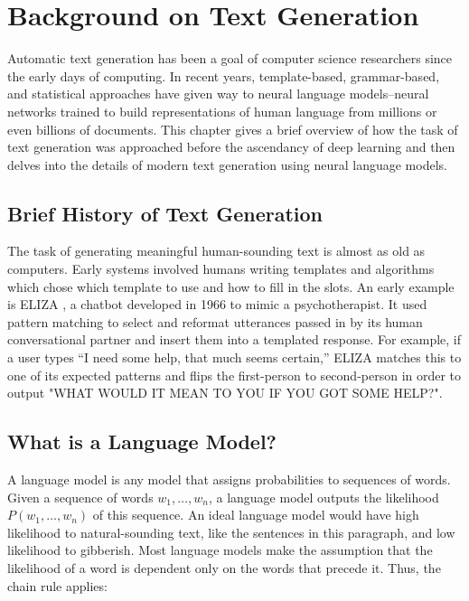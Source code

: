 \chapter{Background on Text Generation}
\label{chap:background}
Automatic text generation has been a goal of computer science researchers since the early days of computing.
In recent years, template-based, grammar-based, and statistical approaches have given way to neural language models--neural networks trained to build representations of human language from millions or even billions of documents.
This chapter gives a brief overview of how the task of text generation was approached before the ascendancy of deep learning and then delves into the details of modern text generation using neural language models.

\section{Brief History of Text Generation}
The task of generating meaningful human-sounding text is almost as old as computers.
Early systems involved humans writing templates and algorithms which chose which template to use and how to fill in the slots.
An early example is ELIZA \cite{eliza}, a chatbot developed in 1966 to mimic a psychotherapist.
It used pattern matching to select and reformat utterances passed in by its human conversational partner and insert them into a templated response.
For example, if a user types ``I need some help, that much seems certain,'' ELIZA matches this to one of its expected patterns and flips the first-person to second-person in order to output "WHAT WOULD IT MEAN TO YOU IF YOU GOT SOME HELP?".

\section{What is a Language Model?}
A language model is any model that assigns probabilities to sequences of words.
Given a sequence of words $w_1, \ldots, w_n$, a language model outputs the likelihood $P(w_1, \ldots, w_n)$ of this sequence.
An ideal language model would have high likelihood to natural-sounding text, like the sentences in this paragraph, and  low likelihood to gibberish.
Most language models make the assumption that the likelihood of a word is dependent only on the words that precede it.
Thus, the chain rule applies:

